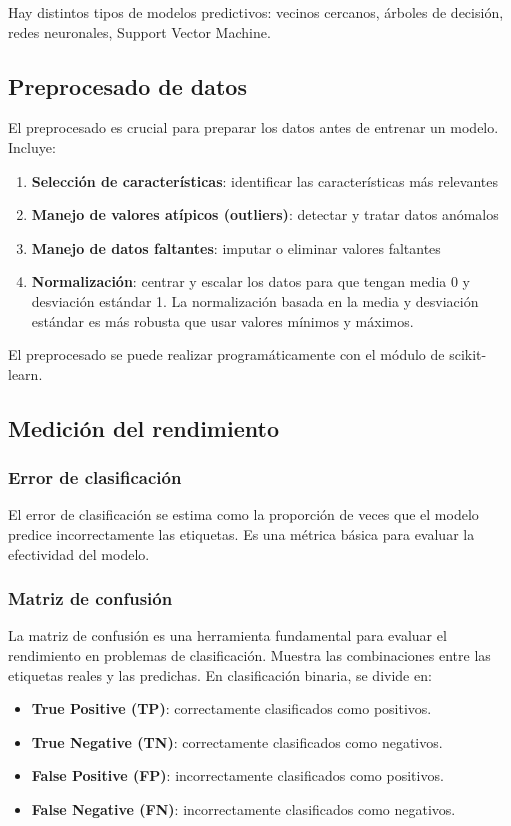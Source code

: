 Hay distintos tipos de modelos predictivos: vecinos cercanos, árboles de decisión, redes neuronales, Support Vector Machine.

\subsection{Preprocesado de datos}
El preprocesado es crucial para preparar los datos antes de entrenar un modelo. Incluye:
\begin{enumerate}
\item \textbf{Selección de características}: identificar las características más relevantes
\item \textbf{Manejo de valores atípicos (outliers)}: detectar y tratar datos anómalos
\item \textbf{Manejo de datos faltantes}: imputar o eliminar valores faltantes
\item \textbf{Normalización}: centrar y escalar los datos para que tengan media 0 y desviación estándar 1. La normalización basada en la media y desviación estándar es más robusta que usar valores mínimos y máximos.
\end{enumerate}

El preprocesado se puede realizar programáticamente con el módulo de scikit-learn.

\subsection{Medición del rendimiento}
\subsubsection{Error de clasificación}
El error de clasificación se estima como la proporción de veces que el modelo predice incorrectamente las etiquetas. Es una métrica básica para evaluar la efectividad del modelo.

\subsubsection{Matriz de confusión}
La matriz de confusión es una herramienta fundamental para evaluar el rendimiento en problemas de clasificación. Muestra las combinaciones entre las etiquetas reales y las predichas. En clasificación binaria, se divide en:
\begin{itemize}
\item \textbf{True Positive (TP)}: correctamente clasificados como positivos.
\item \textbf{True Negative (TN)}: correctamente clasificados como negativos.
\item \textbf{False Positive (FP)}: incorrectamente clasificados como positivos.
\item \textbf{False Negative (FN)}: incorrectamente clasificados como negativos.
\end{itemize}

